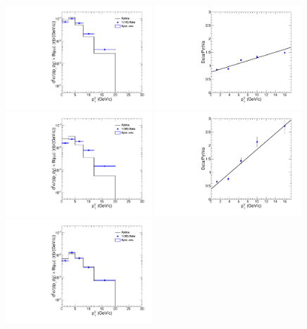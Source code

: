 \begin{figure}
\begin{centering}  
  \includegraphics[width=0.49\textwidth]{Chapters/aCorrection/Y1Spt.pdf}
  \includegraphics[width=0.49\textwidth]{Chapters/aCorrection/RaY1Spt.pdf}
  \includegraphics[width=0.49\textwidth]{Chapters/aCorrection/Y2Spt.pdf}
  \includegraphics[width=0.49\textwidth]{Chapters/aCorrection/RaY2Spt.pdf}
  \includegraphics[width=0.49\textwidth]{Chapters/aCorrection/Y3Spt.pdf}

\end{centering}
\end{figure}
